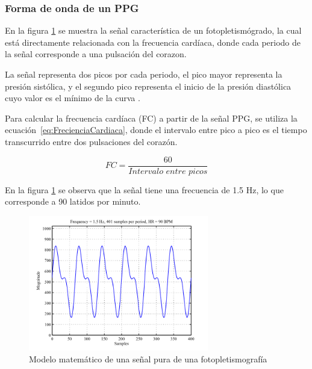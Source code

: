             \subsubsection{Forma de onda de un PPG}

            En la figura \ref{fig:PPG} se muestra la señal característica de un fotopletismógrado, la cual está directamente relacionada con la frecuencia cardíaca, donde cada periodo de la señal corresponde a una pulsación del corazon.

            La señal representa dos picos por cada periodo, el pico mayor representa la presión sistólica, y el segundo pico representa el inicio de la presión diastólica cuyo valor es el mínimo de la curva \cite{Celi_2011}.

            Para calcular la frecuencia cardíaca (FC) a partir de la señal PPG, se utiliza la ecuación~\ref{eq:FrecienciaCardiaca}, donde el intervalo entre pico a pico es el tiempo transcurrido entre dos pulsaciones del corazón.

            \begin{equation}
                \label{eq:FrecienciaCardiaca}
                FC = \frac{60}{\textit{Intervalo entre picos}}
            \end{equation}

            En la figura \ref{fig:PPG} se observa que la señal tiene una frecuencia de 1.5 Hz, lo que corresponde a 90 latidos por minuto.

            \begin{figure}[H]
                \centering
                \includegraphics[width=0.7\textwidth]{img/Marco/PPG_senial.png}
                \caption[Modelo matemático de una señal pura de una fotopletismografía]{Modelo matemático de una señal pura de una fotopletismografía\footnotemark}
                \label{fig:PPG}
            \end{figure}

